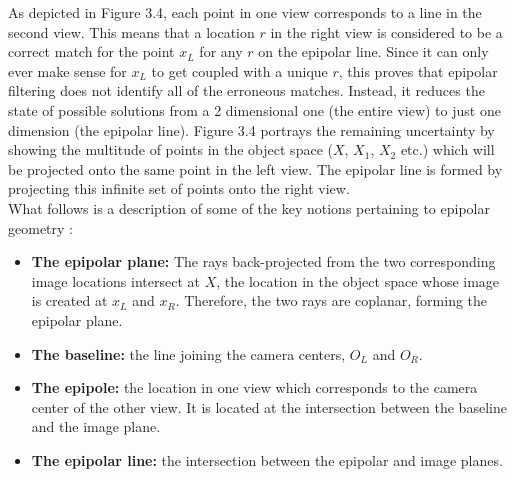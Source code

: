 \documentclass[12pt,a4paper,twoside,openright]{report}
\begin{document}
\linebreak
As depicted in Figure 3.4, each point in one view corresponds to a line in the second view. This means that a location $r$ in the right view is considered to be a correct match for the point $x_{L}$ for any $r$ on the epipolar line. Since it can only ever make sense for $x_{L}$ to get coupled with a unique $r$, this proves that epipolar filtering does not identify all of the erroneous matches. Instead, it reduces the state of possible solutions from a 2 dimensional one (the entire view) to just one dimension (the epipolar line). Figure 3.4 portrays the remaining uncertainty by showing the multitude of points in the object space ($X$, $X_{1}$, $X_{2}$ etc.) which will be projected onto the same point in the left view. The epipolar line is formed by projecting this infinite set of points onto the right view.\\
\linebreak
What follows is a description of some of the key notions pertaining to epipolar geometry \cite[chapter~9]{Hartley+2003}:
\begin{itemize}
\item {\bf{The epipolar plane:}} The rays back-projected from the two corresponding image locations intersect at $X$, the location in the object space whose image is created at $x_{L}$ and $x_{R}$. Therefore, the two rays are coplanar, forming the epipolar plane.  
\item {\bf{The baseline:}} the line joining the camera centers, $O_{L}$ and $O_{R}$.
\item {\bf{The epipole:}} the location in one view which corresponds to the camera center of the other view. It is located at the intersection between the baseline and the image plane. 
\item {\bf{The epipolar line:}} the intersection between the epipolar and image planes. 
\end{itemize}
\end{document}
